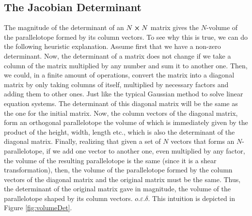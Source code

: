 \documentclass[11pt, a4paper]{article} %
\begin{document}
\subsection*{ The Jacobian Determinant\vspace{-0.2cm}}
The magnitude of the determinant of an $N\cross N$ matrix gives the $N$-volume of the parallelotope formed by its column vectors. To see why this is true, we can do the following heuristic explanation. Assume first that we have a non-zero determinant. Now, the determinant of a matrix does not change if we take a column of the matrix multiplied by any number and sum it to another one. Then, we could, in a finite amount of operations, convert the matrix into a diagonal matrix by only taking columns of itself, multiplied by necessary factors and adding them to other ones. Just like the typical Gaussian method to solve linear equation systems. The determinant of this diagonal matrix will be the same as the one for the initial matrix. Now, the column vectors of the diagonal matrix, form an orthogonal parallelotope the volume of which is immediately given by the product of the height, width, length etc., which is also the determinant of the diagonal matrix. Finally, realizing that given a set of $N$ vectors that forms an $N$-parallelotope, if we add one vector to another one, even multiplied by any factor, the volume of the resulting parallelotope is the same (since it is a shear transformation), then, the volume of the parallelotope formed by the column vectors of the diagonal matrix and the original matrix must be the same. Thus, the determinant of the original matrix gave in magnitude, the volume of the parallelotope shaped by its column vectors. $o.\varepsilon.\delta$. This intuition is depicted in Figure \ref{fig:volumeDet}.
\end{document}
